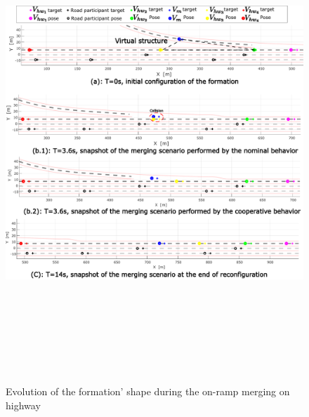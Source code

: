      \begin{figure}[!h]
        \centering 
        \includegraphics[width=13cm,height=18cm,keepaspectratio]{chapters/Chapitre_6/Figures/Scenario_1/Fromation_shape.pdf}
        \caption{Evolution of the formation' shape during the on-ramp merging on highway}
        \label{fig:scenario01:formation_shape}
        \end{figure}




